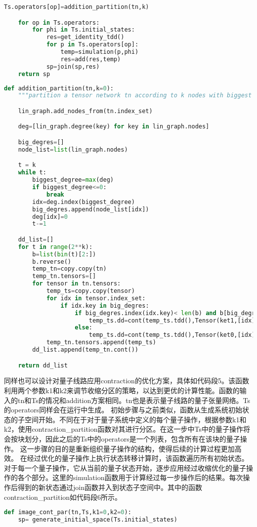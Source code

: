 {\begin{lstlisting}[language=Python, caption=对量子线路应用addition优化方案计算一步迁移]
    Ts.operators[op]=addition_partition(tn,k)

    for op in Ts.operators:
        for phi in Ts.initial_states:
            res=get_identity_tdd()
            for p in Ts.operators[op]:
                temp=simulation(p,phi)
                res=add(res,temp)
            sp=join(sp,res)
    return sp
\end{lstlisting}
\begin{lstlisting}[language=Python, caption={addition方案中的电路划分函数}]
def addition_partition(tn,k=0):
    """partition a tensor network tn according to k nodes with biggest degree"""

    lin_graph.add_nodes_from(tn.index_set)

    deg=[lin_graph.degree(key) for key in lin_graph.nodes]

    big_degres=[]
    node_list=list(lin_graph.nodes)

    t = k
    while t:
        biggest_degree=max(deg)
        if biggest_degree<=0:
            break
        idx=deg.index(biggest_degree)
        big_degres.append(node_list[idx])
        deg[idx]=0
        t-=1

    dd_list=[]
    for t in range(2**k):
        b=list(bin(t)[2:])
        b.reverse()
        temp_tn=copy.copy(tn)
        temp_tn.tensors=[]
        for tensor in tn.tensors:
            temp_ts=copy.copy(tensor)
            for idx in tensor.index_set:
                if idx.key in big_degres:
                    if big_degres.index(idx.key)< len(b) and b[big_degres.index(idx.key)]=='1':
                        temp_ts.dd=cont(temp_ts.tdd(),Tensor(ket1,[idx]).tdd())
                    else:
                        temp_ts.dd=cont(temp_ts.tdd(),Tensor(ket0,[idx]).tdd())
            temp_tn.tensors.append(temp_ts)
        dd_list.append(temp_tn.cont())

    return dd_list
\end{lstlisting}


同样也可以设计对量子线路应用contraction的优化方案，具体如代码段5。该函数利用两个参数k1和k2来调节收缩分区的策略，以达到更优的计算性能。函数的输入的tn和Ts的情况和addition方案相同。tn也是表示量子线路的量子张量网络。Ts的operators同样会在运行中生成。
初始步骤与之前类似，函数从生成系统初始状态的子空间开始。不同在于对于量子系统中定义的每个量子操作，根据参数k1和k2，使用contraction\_partition函数对其进行分区。在这一步中Ts中的量子操作将会按块划分，因此之后的Ts中的operators是一个列表，包含所有在该块的量子操作。
这一步骤的目的是重新组织量子操作的结构，使得后续的计算过程更加高效。
在经过优化的量子操作上执行状态转移计算时，该函数遍历所有初始状态。对于每一个量子操作，它从当前的量子状态开始，逐步应用经过收缩优化的量子操作的各个部分。这里的simulation函数用于计算经过每一步操作后的结果。每次操作后得到的新状态通过join函数并入到状态子空间中。其中的函数contraction\_partition如代码段6所示。
\begin{lstlisting}[language=Python, caption=对量子线路应用contraction优化方案计算一步迁移]
def image_cont_par(tn,Ts,k1=0,k2=0):
    sp= generate_initial_space(Ts.initial_states)


\end{lstlisting}}
